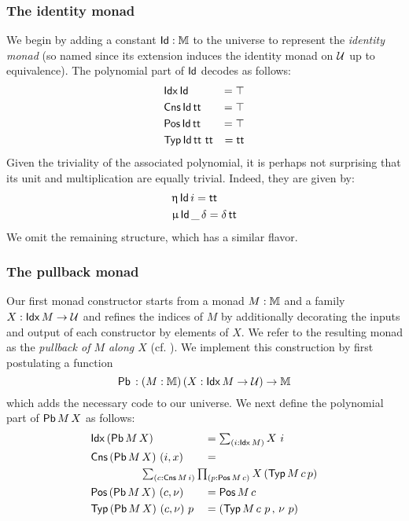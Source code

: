 \subsubsection{The identity monad}

We begin by adding a constant $\mathsf{Id} : \mathbb{M}$ to the universe to represent
the \emph{identity monad} (so named since its extension induces the
identity monad on $\mathcal{U}$ up to equivalence).  The polynomial part of
$\mathsf{Id}$ decodes as follows:
\begin{align*}
  &\mathsf{Idx}\, \mathsf{Id}\, &= \top\\
  &\mathsf{Cns}\, \mathsf{Id}\, \mathsf{tt} &= \top\\
  &\mathsf{Pos}\, \mathsf{Id}\, \mathsf{tt} &= \top\\
  &\mathsf{Typ}\, \mathsf{Id}\, \mathsf{tt}\ \mathsf{tt} &= \mathsf{tt}
\end{align*}
Given the triviality of the associated polynomial, it is perhaps not
surprising that its unit and multiplication are equally trivial.  Indeed,
they are given by:
\begin{align*}
  &\upeta\, \mathsf{Id}\, i = \mathsf{tt} \\
  &\upmu\, \mathsf{Id}\, \_\, \delta = \delta\, \mathsf{tt}
\end{align*}
We omit the remaining structure, which has a similar flavor.

\subsubsection{The pullback monad}

Our first monad constructor starts from a monad $M : \mathbb{M}$ and a family
$X : \mathsf{Idx}\, M \to \mathcal{U}$ and refines the indices of $M$ by additionally
decorating the inputs and output of each constructor by
elements of $X$.  We refer to the resulting monad as the
\emph{pullback of $M$ along $X$} (cf. \cite[Section 2.4]{BD98}).  We
implement this construction by first postulating a function
\[ \mathsf{Pb}\, : (M : \mathbb{M})\, (X : \mathsf{Idx}\, M \to \mathcal{U}) \to \mathbb{M} \] which adds the
necessary code to our universe.  We next define the polynomial part of
$\mathsf{Pb}\, M\, X$ as follows:
\begin{align*}
  &\Idx (\Pb M\, X) &&= \dsum{i : \Idx M} X\ i\\
  &\Cns (\Pb M\, X)\ (i , x) &&= \\
  &&& \hspace{-2cm}\dsum{c : \Cns M\, i} \dprod{p : \Pos M\, c} X\, (\Typ M\, c\, p) \\
  &\Pos (\Pb M\, X)\ (c , \nu) &&= \Pos M\, c\\
  &\Typ (\Pb M\, X)\ (c , \nu)\ p &&= (\Typ M\, c\ p\, ,\, \nu\ p)
\end{align*}

